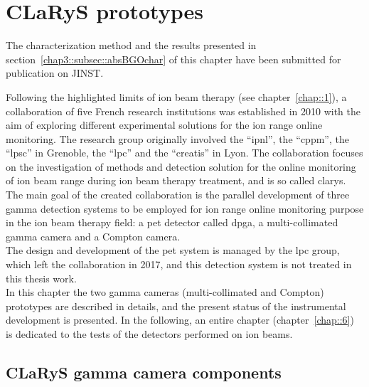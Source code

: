 \chapter{CLaRyS prototypes}\label{chap::3}

The characterization method and the results presented in section~\ref{chap3::subsec::absBGOchar} of this chapter have been submitted for publication on JINST.

\vfill

\minitoc

\newpage

\glsresetall


Following the highlighted limits of ion beam therapy (see chapter~\ref{chap::1}), a collaboration of five French research institutions was established in 2010 with the aim of exploring different experimental solutions for the ion range online monitoring. The research group originally involved the \enquote{\gls{ipnl}}, the \enquote{\gls{cppm}}, the \enquote{\gls{lpsc}} in Grenoble, the \enquote{\gls{lpc}} and the \enquote{\gls{creatis}} in Lyon. The collaboration focuses on the investigation of methods and detection solution for the online monitoring of ion beam range during ion beam therapy treatment, and is so called \gls{clarys}.\\
The main goal of the created collaboration is the parallel development of three gamma detection systems to be employed for ion range online monitoring purpose in the ion beam therapy field: a \gls{pet} detector called \gls{dpga}, a multi-collimated gamma camera and a Compton camera.\\ The design and development of the \gls{pet} system is managed by the \gls{lpc} group, which left the collaboration in 2017, and this detection system is not treated in this thesis work.\\ 
In this chapter the two gamma cameras (multi-collimated and Compton) prototypes are described in details, and the present status of the instrumental development is presented. In the following, an entire chapter (chapter~\ref{chap::6}) is dedicated to the tests of the detectors performed on ion beams. 

\section{CLaRyS gamma camera components}\label{chap3::sec::CLaRyScameras}

